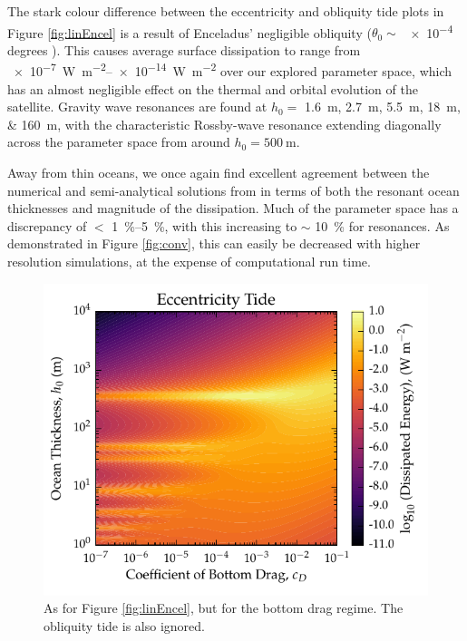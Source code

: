 The stark colour difference between the eccentricity and obliquity tide plots in Figure \ref{fig:linEncel} is a result of Enceladus' negligible obliquity ($\theta_0 \sim$ \num{e-4} degrees \citep{chen2011obliquity, baland2016obliquity}). This causes average surface dissipation to range from \SIrange{e-7}{e-14}{\watt\per\square\metre} over our explored parameter space, which has an almost negligible effect on the thermal and orbital evolution of the satellite. Gravity wave resonances are found at $h_0 =$ \SIlist{1.6;2.7;5.5;18;160}{\metre}, with the characteristic Rossby-wave resonance extending diagonally across the parameter space from around $h_0 = \SI{500}{\metre}$.

Away from thin oceans, we once again find excellent agreement between the numerical and semi-analytical solutions from \citet{matsuyama2014tidal} in terms of both the resonant ocean thicknesses and magnitude of the dissipation. Much of the parameter space has a discrepancy of $<$ \SIrange{1}{5}{\percent}, with this increasing to $\sim$ \SI{10}{\percent} for resonances. As demonstrated in Figure \ref{fig:conv}, this can easily be decreased with higher resolution simulations, at the expense of computational run time.

\begin{figure}[!t]
    \centering
    \includegraphics[width=0.95\linewidth]{Figures/enceladus_bottom}
\caption{As for Figure \ref{fig:linEncel}, but for the bottom drag regime. The obliquity tide is also ignored. \label{fig:botEncel}}
\end{figure}


